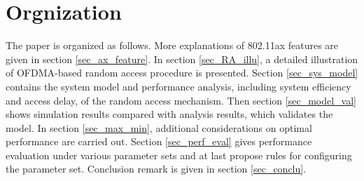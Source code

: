 \section{Orgnization}
The paper is organized as follows.
More explanations of 802.11ax features are given in section \ref{sec_ax_feature}. 
In section \ref{sec_RA_illu}, a detailed illustration of OFDMA-based random access procedure is presented.
Section \ref{sec_sys_model} contains the system model and performance analysis, including system efficiency and access delay, of the random access mechanism. 
Then section \ref{sec_model_val} shows simulation results compared with analysis results, which validates the model.
In section \ref{sec_max_min}, additional considerations on optimal performance are carried out. 
Section \ref{sec_perf_eval} gives performance evaluation under various parameter sets and at last propose rules for configuring the parameter set.
Conclusion remark is given in section \ref{sec_conclu}.

%
%
%

